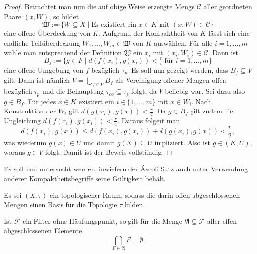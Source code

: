 \begin{proof}
  Betrachtet man nun die auf obige Weise erzeugte Menge $\mathcal{C}$ aller geordneten Paare $(x,W)$, so bildet
  \begin{displaymath}
    \mathfrak{W} := \{W \subseteq X \mid \text{Es existiert ein $x \in K$ mit $(x,W) \in \mathcal{C}$} \}
  \end{displaymath}
  eine offene Überdeckung von $K$.
  Aufgrund der Kompaktheit von $K$ lässt sich eine endliche Teilüberdeckung $W_1,\dots,W_m \in \mathfrak{W}$ von $K$ auswählen.
  Für alle $i = 1,\dots,m$ wähle man entsprechend der Definition $\mathfrak{W}$ ein $x_i$ mit $(x_i,W_i) \in \mathcal{C}$.
  Dann ist
  \begin{displaymath}
    B_f := \{ g \in F \mid d(f(x_i),g(x_i)) < \tfrac{r}{4} \text{ für } i = 1,\dots,m\}
  \end{displaymath}
  eine offene Umgebung von $f$ bezüglich $\tau_p$.
  Es soll nun gezeigt werden, dass $B_f \subseteq V$ gilt.
  Dann ist nämlich $V = \bigcup_{f \in V} B_f$ als Vereinigung offener Mengen offen bezüglich $\tau_p$ und die Behauptung $\tau_{co} \subseteq \tau_p$ folgt, da $V$ beliebig war.
  Sei dazu also $g \in B_f$.
  Für jedes $x \in K$ existiert ein $i \in \{1,\dots,m\}$ mit $x \in W_i$.
  Nach Konstruktion der $W_i$ gilt $d(g(x_i),g(x)) < \tfrac{r}{4}$.
  Da $g \in B_f$ gilt zudem die Ungleichung $d(f(x_i),g(x_i)) < \tfrac{r}{4}$.
  Daraus folgert man
  \begin{displaymath}
    d(f(x_i),g(x)) \leq d(f(x_i),g(x_i)) + d(g(x_i),g(x)) < \frac{r}{2},
  \end{displaymath}
  was wiederum $g(x) \in U$ und damit $g(K) \subseteq U$ impliziert. 
  Also ist $g \in (K,U)$, woraus $g \in V$ folgt.
  Damit ist der Beweis vollständig.
\end{proof}

Es soll nun untersucht werden, inwiefern der Áscoli Satz auch unter Verwendung anderer Kompaktheitsbegriffe seine Gültigkeit behält.

\begin{lem}
  \label{lem:filterclusterpoint}
  Es sei $(X,\tau)$ ein topologischer Raum, sodass die darin offen-abgeschlossenen Mengen einen Basis für die Topologie $\tau$ bilden.

  Ist $\mathcal{F}$ ein Filter ohne Häufungspunkt, so gilt für die Menge $\mathfrak{A} \subseteq \mathcal{F}$ aller offen-abgeschlossenen Elemente 
  \begin{displaymath}
    \bigcap_{F \in \mathfrak{A}} F = \emptyset.
  \end{displaymath}
\end{lem}

